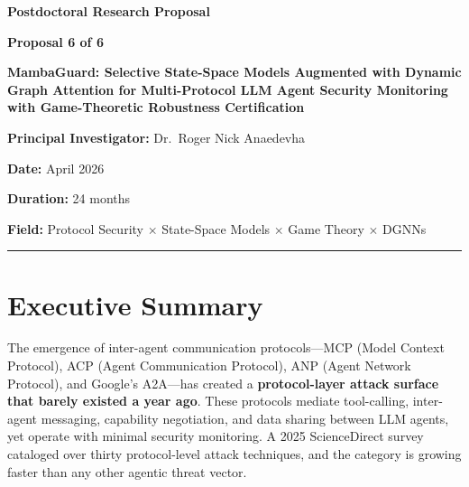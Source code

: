 \documentclass[12pt,a4paper]{article}
\begin{document}
\begin{center}
{\LARGE \textbf{Postdoctoral Research Proposal}}

\vspace{0.5cm}

{\Large \textbf{Proposal 6 of 6}}

\vspace{1cm}

{\huge \textbf{MambaGuard: Selective State-Space Models Augmented with Dynamic Graph Attention for Multi-Protocol LLM Agent Security Monitoring with Game-Theoretic Robustness Certification}}

\vspace{1cm}

{\large \textbf{Principal Investigator:} Dr.\ Roger Nick Anaedevha}

\vspace{0.3cm}

{\large \textbf{Date:} April 2026}

\vspace{0.3cm}

{\large \textbf{Duration:} 24 months}

\vspace{0.3cm}

{\large \textbf{Field:} Protocol Security $\times$ State-Space Models $\times$ Game Theory $\times$ DGNNs}

\end{center}

\vspace{1cm}
\hrule
\vspace{0.5cm}

\tableofcontents

\newpage

\section{Executive Summary}

The emergence of inter-agent communication protocols---MCP (Model Context Protocol), ACP (Agent Communication Protocol), ANP (Agent Network Protocol), and Google's A2A---has created a \textbf{protocol-layer attack surface that barely existed a year ago}. These protocols mediate tool-calling, inter-agent messaging, capability negotiation, and data sharing between LLM agents, yet operate with minimal security monitoring. A 2025 ScienceDirect survey cataloged over thirty protocol-level attack techniques, and the category is growing faster than any other agentic threat vector.
\end{document}
